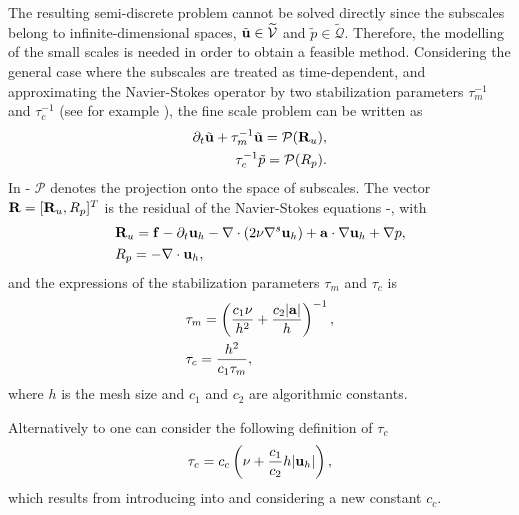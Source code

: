 The resulting semi-discrete problem  cannot be solved directly since the subscales belong to infinite-dimensional spaces, $ \tilde{{\bf u}}\in\widetilde{\mathcal{V}} $ and $ \tilde{p}\in\widetilde{\mathcal{Q}} $. Therefore, the modelling of the small scales is needed in order to obtain a feasible method. Considering the general case where the subscales are treated as time-dependent, and approximating the Navier-Stokes operator by two stabilization parameters $\tau_m^{-1}$ and $\tau_c^{-1}$ (see for example \cite{codina_time_2007}), the fine scale problem can be written as
\begin{align}
\label{eq-C7_velo_sgs}
\partial_t\tilde{{\bf u}}+\tau_m^{-1}\tilde{{\bf u}}=\mathcal{P}({\bf R}_u),\\
\label{eq-C7_press_sgs}
\tau_c^{-1}\tilde{p}=\mathcal{P}(R_p).
\end{align}
In - $\mathcal{P}$ denotes the projection onto the space of subscales. The vector ${\bf R}=[{\bf R}_u,R_p]^T$ is the residual of the Navier-Stokes equations -, with
\begin{align}
\label{eq-C7_Ru}
&{\bf R}_u={\bf f}-\partial_t{\bf u}_h-\nabla\cdot\left(2\nu\nabla^s{\bf u}_h\right)+{\bf a}\cdot\nabla{\bf u}_h+\nabla p,\\
\label{eq-C7_Rp}
&R_p=-\nabla\cdot{\bf u}_h,
\end{align}
and the expressions of the stabilization parameters $\tau_m$ and $\tau_c$ is 
\begin{align}
\label{eq-C7_tau_m}
&\tau_m=\left(\frac{c_1\nu}{h^2}+\frac{c_2|{\bf a}|}{h}\right)^{-1},\\
\label{eq-C7_tau_c}
&\tau_c=\frac{h^2}{c_1\tau_m},
\end{align}
where $h$ is the mesh size and $c_1$ and $c_2$ are algorithmic constants.

Alternatively to  one can consider the following definition of $ \tau_c $
\begin{equation}
\label{eq-C7_tau_c_alt}
\tau_c=c_c\left(\nu+\frac{c_1}{c_2}h|{\bf u}_h|\right),
\end{equation}
which results from introducing  into  and considering a new constant $ c_c $.

